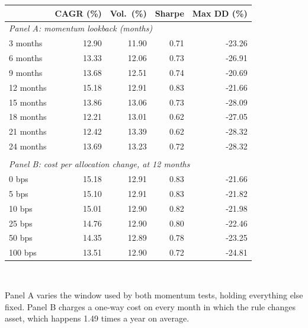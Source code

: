 \small
\begin{tabular}{lrrrr}
\toprule
 & \textbf{CAGR (\%)} & \textbf{Vol.\ (\%)} & \textbf{Sharpe} & \textbf{Max DD (\%)} \\
\midrule
\multicolumn{5}{l}{\emph{Panel A: momentum lookback (months)}} \\
3 months & 12.90 & 11.90 & 0.71 & -23.26 \\
6 months & 13.33 & 12.06 & 0.73 & -26.91 \\
9 months & 13.68 & 12.51 & 0.74 & -20.69 \\
12 months & 15.18 & 12.91 & 0.83 & -21.66 \\
15 months & 13.86 & 13.06 & 0.73 & -28.09 \\
18 months & 12.21 & 13.01 & 0.62 & -27.05 \\
21 months & 12.42 & 13.39 & 0.62 & -28.32 \\
24 months & 13.69 & 13.23 & 0.72 & -28.32 \\
\addlinespace \\
\multicolumn{5}{l}{\emph{Panel B: cost per allocation change, at 12 months}} \\
0 bps & 15.18 & 12.91 & 0.83 & -21.66 \\
5 bps & 15.10 & 12.91 & 0.83 & -21.82 \\
10 bps & 15.01 & 12.90 & 0.82 & -21.98 \\
25 bps & 14.76 & 12.90 & 0.80 & -22.46 \\
50 bps & 14.35 & 12.89 & 0.78 & -23.25 \\
100 bps & 13.51 & 12.90 & 0.72 & -24.81 \\
\bottomrule
\end{tabular}
\\[0.4em]
\begin{minipage}{\linewidth}\footnotesize Panel A varies the window used by both momentum tests, holding everything else fixed. Panel B charges a one-way cost on every month in which the rule changes asset, which happens 1.49 times a year on average.\end{minipage}
